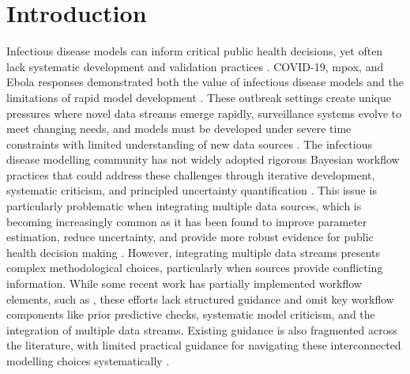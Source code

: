 \documentclass{article}
\begin{document}
\tableofcontents
\newpage

\section{Introduction}

Infectious disease models can inform critical public health decisions, yet often lack systematic development and validation practices \citep{Ward2024-sp, Fyles2024-qz, Abbott2021-delta, Abbott2022-prevalence}.
COVID-19, mpox, and Ebola responses demonstrated both the value of infectious disease models and the limitations of rapid model development \citep{knock2021key, ro2025estimating, Abbott2021-delta, Abbott2022-prevalence, Ward2024-sp,birrell2025real}.
These outbreak settings create unique pressures where novel data streams emerge rapidly, surveillance systems evolve to meet changing needs, and models must be developed under severe time constraints with limited understanding of new data sources \citep{mccaw2023role}.
The infectious disease modelling community has not widely adopted rigorous Bayesian workflow practices that could address these challenges through iterative development, systematic criticism, and principled uncertainty quantification \citep{gelman2020bayesian, nicholson2022interoperability}.
This issue is particularly problematic when integrating multiple data sources, which is becoming increasingly common as it has been found to improve parameter estimation, reduce uncertainty, and provide more robust evidence for public health decision making \citep{deangelis2018analysing, sherratt2021exploring}.
However, integrating multiple data streams presents complex methodological choices, particularly when sources provide conflicting information.
While some recent work has partially implemented workflow elements, such as \citet{bouman2024bayesian}, these efforts lack structured guidance and omit key workflow components like prior predictive checks, systematic model criticism, and the integration of multiple data streams.
Existing guidance is also fragmented across the literature, with limited practical guidance for navigating these interconnected modelling choices systematically \citep{nicholson2022interoperability, deangelis2018analysing}.
\end{document}
